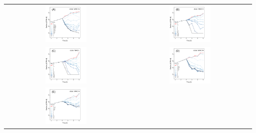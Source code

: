 \documentclass{article}
\begin{document}
\begin{center}
\centering
\begin{tabularx}{1\textwidth}{cc}
\includegraphics[trim = 0mm 0mm 0mm 0mm, clip,width=0.35\textwidth]{WHOG_CIPregression} &
\includegraphics[trim = 0mm 0mm 0mm 0mm, clip,width=0.35\textwidth]{WHOK_CIPregression}\\    
\includegraphics[trim = 0mm 0mm 0mm 0mm, clip,width=0.35\textwidth]{WHOL_CIPregression} &  
\includegraphics[trim = 0mm 0mm 0mm 0mm, clip,width=0.35\textwidth]{WHOM_CIPregression}   \\
\includegraphics[trim = 0mm 0mm 0mm 0mm, clip,width=0.35\textwidth]{WHON_CIPregression} & 

\end{tabularx}
\end{center}
\end{document}
